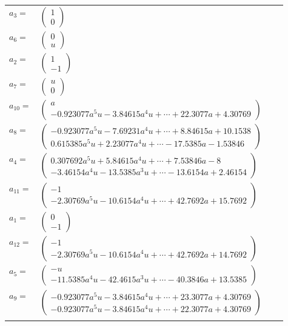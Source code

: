 \documentclass[1p]{elsarticle_modified}
\theoremstyle{definition}
\begin{document}
\begin{tabular}{m{7pt} m{180pt} m{7pt} m{180pt} }
\flushright $a_{3}=$&$\begin{pmatrix}1\\0\end{pmatrix}$ \\
\flushright $a_{6}=$&$\begin{pmatrix}0\\u\end{pmatrix}$ \\
\flushright $a_{2}=$&$\begin{pmatrix}1\\-1\end{pmatrix}$ \\
\flushright $a_{7}=$&$\begin{pmatrix}u\\0\end{pmatrix}$ \\
\flushright $a_{10}=$&$\begin{pmatrix}a\\-0.923077 a^{5} u-3.84615 a^{4} u+\cdots+22.3077 a+4.30769\end{pmatrix}$ \\
\flushright $a_{8}=$&$\begin{pmatrix}-0.923077 a^{5} u-7.69231 a^{4} u+\cdots+8.84615 a+10.1538\\0.615385 a^{5} u+2.23077 a^{4} u+\cdots-17.5385 a-1.53846\end{pmatrix}$ \\
\flushright $a_{4}=$&$\begin{pmatrix}0.307692 a^{5} u+5.84615 a^{4} u+\cdots+7.53846 a-8\\-3.46154 a^{4} u-13.5385 a^{3} u+\cdots-13.6154 a+2.46154\end{pmatrix}$ \\
\flushright $a_{11}=$&$\begin{pmatrix}-1\\-2.30769 a^{5} u-10.6154 a^{4} u+\cdots+42.7692 a+15.7692\end{pmatrix}$ \\
\flushright $a_{1}=$&$\begin{pmatrix}0\\-1\end{pmatrix}$ \\
\flushright $a_{12}=$&$\begin{pmatrix}-1\\-2.30769 a^{5} u-10.6154 a^{4} u+\cdots+42.7692 a+14.7692\end{pmatrix}$ \\
\flushright $a_{5}=$&$\begin{pmatrix}- u\\-11.5385 a^{4} u-42.4615 a^{3} u+\cdots-40.3846 a+13.5385\end{pmatrix}$ \\
\flushright $a_{9}=$&$\begin{pmatrix}-0.923077 a^{5} u-3.84615 a^{4} u+\cdots+23.3077 a+4.30769\\-0.923077 a^{5} u-3.84615 a^{4} u+\cdots+22.3077 a+4.30769\end{pmatrix}$\\&\end{tabular}
\end{document}
